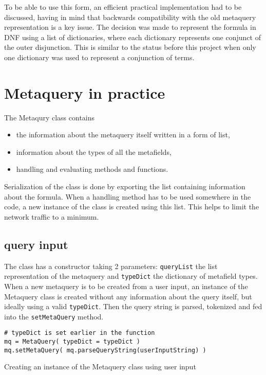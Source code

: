 To be able to use this form, an efficient practical implementation had to be discussed, having in 
mind that backwards compatibility with the old metaquery representation is a key issue. The decision 
was made to represent the formula in DNF using a list of dictionaries, where each dictionary 
represents one conjunct of the outer disjunction. This is similar to the status before this project
when only one dictionary was used to represent a conjunction of terms. 

\section{Metaquery in practice}

The Metaqury class contains 
\begin{itemize}
\item the information about the metaquery itself written in a form of list,
\item information about the types of all the metafields,
\item handling and evaluating methods and functions.
\end{itemize}
Serialization of the class is done by exporting the list containing information about the formula. 
When a handling method has to be used somewhere in the code, a new instance of the class is created 
using this list. This helps to limit the network traffic to a minimum. 

\subsection{query input}

The class has a constructor taking 2 parameters: \texttt{queryList} the list representation of the 
metaquery and \texttt{typeDict} the dictionary of metafield types. When a new metaquery is to be 
created from a user input, an instance of the Metaquery class is created without any information
about the query itself, but ideally using a valid \texttt{typeDict}. Then the query string is parsed, tokenized and fed into the \texttt{setMetaQuery} method.

\begin{listing}
\begin{verbatim}
# typeDict is set earlier in the function
mq = MetaQuery( typeDict = typeDict )
mq.setMetaQuery( mq.parseQueryString(userInputString) )
\end{verbatim}
\caption{Creating an instance of the Metaquery class using user input}
\end{listing}

